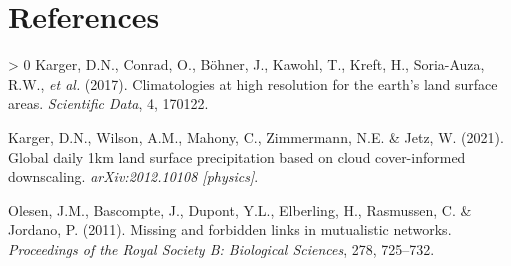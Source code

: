 \documentclass[10pt,oneside]{article}
\newlength{\cslhangindent}
\newenvironment{CSLReferences}[3] %
 {%
  \setlength{\parindent}{0pt}
  \ifodd #1 \everypar{\setlength{\hangindent}{\cslhangindent}}\ignorespaces\fi
  \ifnum #2 > 0
  \setlength{\parskip}{#2\baselineskip}
  \fi
 }%
 {}
\begin{document}
\hypertarget{references}{%
\section*{References}\label{references}}

\hypertarget{refs}{}
\begin{CSLReferences}{1}{0}
\leavevmode\hypertarget{ref-Karger2017CliHig}{}%
Karger, D.N., Conrad, O., Böhner, J., Kawohl, T., Kreft, H., Soria-Auza,
R.W., \emph{et al.} (2017). Climatologies at high resolution for the
earth's land surface areas. \emph{Scientific Data}, 4, 170122.

\leavevmode\hypertarget{ref-Karger2021GloDai}{}%
Karger, D.N., Wilson, A.M., Mahony, C., Zimmermann, N.E. \& Jetz, W.
(2021). Global daily 1km land surface precipitation based on cloud
cover-informed downscaling. \emph{arXiv:2012.10108 {[}physics{]}}.

\leavevmode\hypertarget{ref-Olesen2011MisFor}{}%
Olesen, J.M., Bascompte, J., Dupont, Y.L., Elberling, H., Rasmussen, C.
\& Jordano, P. (2011). Missing and forbidden links in mutualistic
networks. \emph{Proceedings of the Royal Society B: Biological
Sciences}, 278, 725--732.

\end{CSLReferences}
\end{document}
